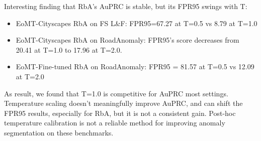 Interesting finding that RbA's AuPRC is stable, but its FPR95 swings with T:
\begin{itemize}
    \item EoMT-Cityscapes RbA on FS L\&F: FPR95=67.27 at T=0.5 vs 8.79 at T=1.0
    \item EoMT-Cityscapes RbA on RoadAnomaly: FPR95's score decreases from 20.41 at T=1.0 to 17.96 at T=2.0.
    \item EoMT-Fine-tuned RbA on RoadAnomaly: FPR95 = 81.57 at T=0.5 vs 12.09 at T=2.0
\end{itemize}

As result, we found that T=1.0 is competitive for AuPRC most settings. Temperature scaling doesn't meaningfully improve AuPRC, and can shift the FPR95 results, especially for RbA, but it is not a consistent gain.
Post-hoc temperature calibration is not a reliable method for improving anomaly segmentation on these benchmarks.